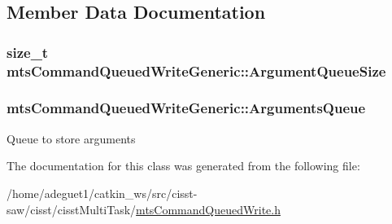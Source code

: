 \subsection{Member Data Documentation}
\hypertarget{classmts_command_queued_write_generic_ad1c8cda6d29a47d37496ed38330530ad}{
\subsubsection[{Argument\-Queue\-Size}]{\setlength{\rightskip}{0pt plus 5cm}size\-\_\-t mts\-Command\-Queued\-Write\-Generic\-::\-Argument\-Queue\-Size\hspace{0.3cm}{\ttfamily [protected]}}}\label{classmts_command_queued_write_generic_ad1c8cda6d29a47d37496ed38330530ad}
\hypertarget{classmts_command_queued_write_generic_aed20ecad144f2e1aa6d26ba37e71e3ea}{
\subsubsection[{Arguments\-Queue}]{ mts\-Command\-Queued\-Write\-Generic\-::\-Arguments\-Queue\hspace{0.3cm}{\ttfamily [protected]}}}\label{classmts_command_queued_write_generic_aed20ecad144f2e1aa6d26ba37e71e3ea}
Queue to store arguments 

The documentation for this class was generated from the following file\-:\begin{DoxyCompactItemize}
\item 
/home/adeguet1/catkin\-\_\-ws/src/cisst-\/saw/cisst/cisst\-Multi\-Task/\hyperlink{mts_command_queued_write_8h}{mts\-Command\-Queued\-Write.\-h}\end{DoxyCompactItemize}
